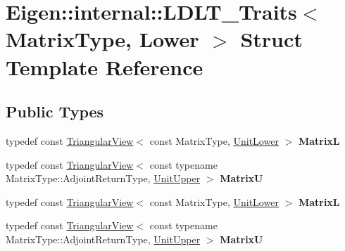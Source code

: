 \hypertarget{struct_eigen_1_1internal_1_1_l_d_l_t___traits_3_01_matrix_type_00_01_lower_01_4}{}\section{Eigen\+:\+:internal\+:\+:L\+D\+L\+T\+\_\+\+Traits$<$ Matrix\+Type, Lower $>$ Struct Template Reference}
\label{struct_eigen_1_1internal_1_1_l_d_l_t___traits_3_01_matrix_type_00_01_lower_01_4}
\subsection*{Public Types}
\begin{DoxyCompactItemize}
\item 
\mbox{\label{struct_eigen_1_1internal_1_1_l_d_l_t___traits_3_01_matrix_type_00_01_lower_01_4_af252a9d086be312be301820816c0a986}} 
typedef const \hyperlink{group___core___module_class_eigen_1_1_triangular_view}{Triangular\+View}$<$ const Matrix\+Type, \hyperlink{group__enums_gga39e3366ff5554d731e7dc8bb642f83cda8155cfdfde9e75e7144dff0393d17181}{Unit\+Lower} $>$ {\bfseries MatrixL}
\item 
\mbox{\label{struct_eigen_1_1internal_1_1_l_d_l_t___traits_3_01_matrix_type_00_01_lower_01_4_a6106eb13540e7936645b13da031ef2fe}} 
typedef const \hyperlink{group___core___module_class_eigen_1_1_triangular_view}{Triangular\+View}$<$ const typename Matrix\+Type\+::\+Adjoint\+Return\+Type, \hyperlink{group__enums_gga39e3366ff5554d731e7dc8bb642f83cda8b0b63ff46dcd7377b59df14e0562fc1}{Unit\+Upper} $>$ {\bfseries MatrixU}
\item 
\mbox{\label{struct_eigen_1_1internal_1_1_l_d_l_t___traits_3_01_matrix_type_00_01_lower_01_4_af252a9d086be312be301820816c0a986}} 
typedef const \hyperlink{group___core___module_class_eigen_1_1_triangular_view}{Triangular\+View}$<$ const Matrix\+Type, \hyperlink{group__enums_gga39e3366ff5554d731e7dc8bb642f83cda8155cfdfde9e75e7144dff0393d17181}{Unit\+Lower} $>$ {\bfseries MatrixL}
\item 
\mbox{\label{struct_eigen_1_1internal_1_1_l_d_l_t___traits_3_01_matrix_type_00_01_lower_01_4_a6106eb13540e7936645b13da031ef2fe}} 
typedef const \hyperlink{group___core___module_class_eigen_1_1_triangular_view}{Triangular\+View}$<$ const typename Matrix\+Type\+::\+Adjoint\+Return\+Type, \hyperlink{group__enums_gga39e3366ff5554d731e7dc8bb642f83cda8b0b63ff46dcd7377b59df14e0562fc1}{Unit\+Upper} $>$ {\bfseries MatrixU}
\end{DoxyCompactItemize}
